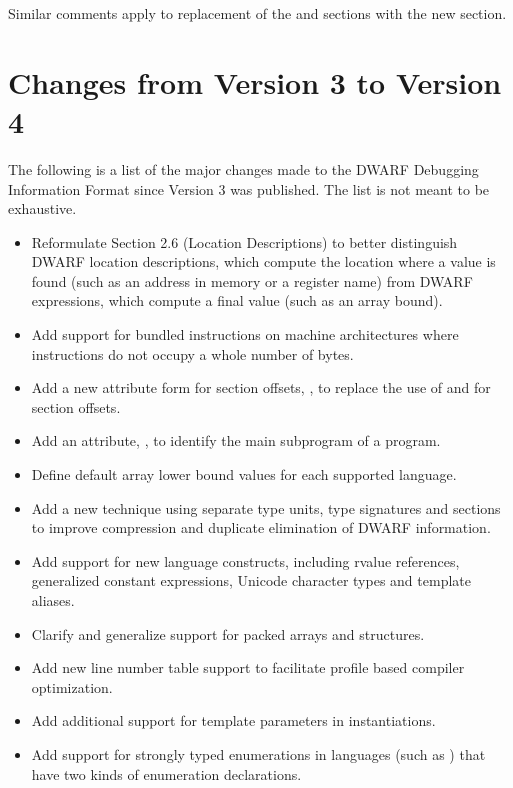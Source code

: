 Similar comments apply to replacement of the \dotdebugpubnames{} 
and \dotdebugpubtypes{} sections with the new \dotdebugnames{} 
section.

\section{Changes from Version 3 to Version 4}
The following is a list of the major changes made to the 
DWARF Debugging Information Format since Version 3 was 
published. The list is not meant to be exhaustive.
\begin{itemize}
\item Reformulate 
Section 2.6 (Location Descriptions) 
to better distinguish DWARF location descriptions, which
compute the location where a value is found (such as an 
address in memory or a register name) from DWARF expressions, 
which compute a final value (such as an array bound).
\item Add support for bundled instructions on machine architectures 
where instructions do not occupy a whole number of bytes.
\item Add a new attribute form for section offsets, 
\DWFORMsecoffsetNAME,
to replace the use of 
\DWFORMdatafourNAME{} and \DWFORMdataeightNAME{} for section offsets.
\item Add an attribute, \DWATmainsubprogramNAME, to identify the main subprogram of a
program.
\item Define default array lower bound values for each supported language.
\item Add a new technique using separate type units, type signatures and \COMDAT{} sections to
improve compression and duplicate elimination of DWARF information.
\item Add support for new  language constructs, including rvalue references, generalized
constant expressions, Unicode character types and template aliases.
\item Clarify and generalize support for packed arrays and structures.
\item Add new line number table support to facilitate profile based compiler optimization.
\item Add additional support for template parameters in instantiations.
\item Add support for strongly typed enumerations in languages (such as ) that have two
kinds of enumeration declarations.
\end{itemize}
